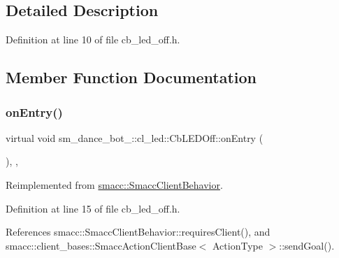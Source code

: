 \subsection{Detailed Description}


Definition at line 10 of file cb\+\_\+led\+\_\+off.\+h.



\subsection{Member Function Documentation}
\mbox{\label{classsm__dance__bot__2_1_1cl__led_1_1CbLEDOff_a101b78da1cfd4dcbec6fc607c956bd14}} 
\subsubsection{\texorpdfstring{on\+Entry()}{onEntry()}}
{\footnotesize\ttfamily virtual void sm\+\_\+dance\+\_\+bot\+\_\+::cl\+\_\+led\+::\+Cb\+L\+E\+D\+Off\+::on\+Entry (\begin{DoxyParamCaption}{ }\end{DoxyParamCaption})\hspace{0.3cm}{\ttfamily [inline]}, {\ttfamily [override]}, {\ttfamily [virtual]}}



Reimplemented from \hyperlink{classsmacc_1_1SmaccClientBehavior_a7962382f93987c720ad432fef55b123f}{smacc\+::\+Smacc\+Client\+Behavior}.



Definition at line 15 of file cb\+\_\+led\+\_\+off.\+h.



References smacc\+::\+Smacc\+Client\+Behavior\+::requires\+Client(), and smacc\+::client\+\_\+bases\+::\+Smacc\+Action\+Client\+Base$<$ Action\+Type $>$\+::send\+Goal().


